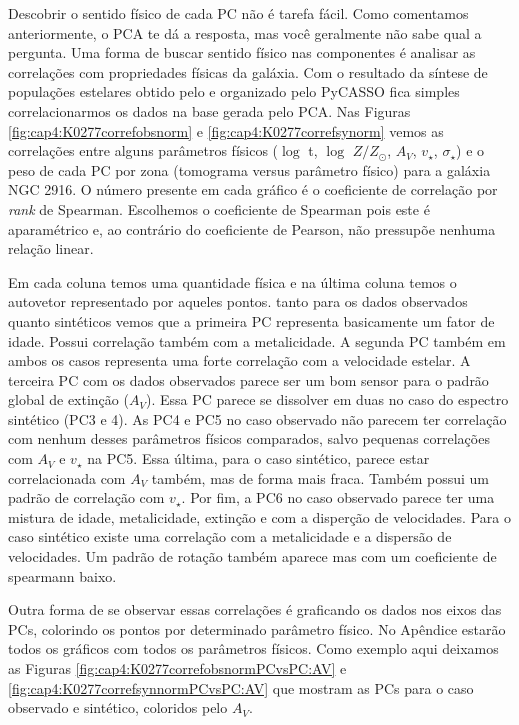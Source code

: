 Descobrir o sentido físico de cada PC não é tarefa fácil. Como comentamos anteriormente, o PCA te dá a resposta, mas
você geralmente não sabe qual a pergunta. Uma forma de buscar sentido físico nas componentes é analisar as correlações
com propriedades físicas da galáxia. Com o resultado da síntese de populações estelares obtido pelo \starlight e
organizado pelo PyCASSO fica simples correlacionarmos os dados na base gerada pelo PCA. Nas Figuras
\ref{fig:cap4:K0277correfobsnorm} e \ref{fig:cap4:K0277correfsynorm} vemos as correlações entre alguns parâmetros
físicos ($\log$ t, $\log$ $Z / Z_{\odot}$, $A_V$, $v_{\star}$, $\sigma_{\star}$) e o peso de cada PC por zona (tomograma
versus parâmetro físico) para a galáxia NGC 2916. O número presente em cada gráfico é o coeficiente de correlação por
{\em rank} de Spearman. Escolhemos o coeficiente de Spearman pois este é aparamétrico e, ao contrário do coeficiente de
Pearson, não pressupõe nenhuma relação linear.

Em cada coluna temos uma quantidade física e na última coluna temos o autovetor representado por aqueles pontos. tanto
para os dados observados quanto sintéticos vemos que a primeira PC representa basicamente um fator de idade. Possui
correlação também com a metalicidade. A segunda PC também em ambos os casos representa uma forte correlação com a
velocidade estelar. A terceira PC com os dados observados parece ser um bom sensor para o padrão global de extinção
($A_V$). Essa PC parece se dissolver em duas no caso do espectro sintético (PC3 e 4). As PC4 e PC5 no caso observado não
parecem ter correlação com nenhum desses parâmetros físicos comparados, salvo pequenas correlações com $A_V$ e $v_\star$
na PC5. Essa última, para o caso sintético, parece estar correlacionada com $A_V$ também, mas de forma mais fraca.
Também possui um padrão de correlação com $v_\star$. Por fim, a PC6 no caso observado parece ter uma mistura de idade,
metalicidade, extinção e com a disperção de velocidades. Para o caso sintético existe uma correlação com a metalicidade
e a dispersão de velocidades. Um padrão de rotação também aparece mas com um coeficiente de spearmann baixo.

Outra forma de se observar essas correlações é graficando os dados nos eixos das PCs, colorindo os pontos por
determinado parâmetro físico. No Apêndice estarão todos os gráficos com todos os parâmetros físicos. Como exemplo aqui
deixamos as Figuras \ref{fig:cap4:K0277correfobsnormPCvsPC:AV} e \ref{fig:cap4:K0277correfsynnormPCvsPC:AV} que mostram
as PCs para o caso observado e sintético, coloridos pelo $A_V$.

